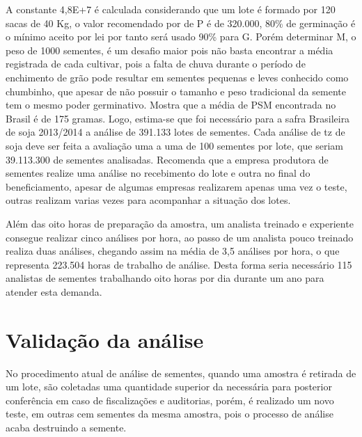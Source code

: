 A constante 4,8E+7 é calculada considerando que um lote é formado por 120 sacas de 40 Kg, o valor recomendado por \cite{abc} de P é de 320.000, 80\% de germinação é o mínimo aceito por lei por tanto será usado 90\% para G. Porém determinar M, o peso de 1000 sementes, é um desafio maior pois não basta encontrar a média registrada de cada cultivar, pois a falta de chuva durante o período de enchimento de grão pode resultar em sementes pequenas e leves \cite{abc} conhecido como chumbinho, que apesar de não possuir o tamanho e peso tradicional da semente tem o mesmo poder germinativo. \cite{abc} Mostra que a média de PSM encontrada no Brasil é de 175 gramas. Logo, estima-se que foi necessário para a safra Brasileira de soja 2013/2014 a análise de 391.133 lotes de sementes. Cada análise de tz de soja deve ser feita a avaliação uma a uma de 100 sementes por lote, que seriam 39.113.300 de sementes analisadas. \cite{abc} Recomenda que a empresa produtora de sementes realize uma análise no recebimento do lote e outra no final do beneficiamento, apesar de algumas empresas realizarem apenas uma vez o teste, outras realizam varias vezes para acompanhar a situação dos lotes. 


Além das oito horas de preparação da amostra, um analista treinado e experiente consegue realizar cinco análises por hora, ao passo de um analista pouco treinado realiza duas análises, chegando assim na média de 3,5 análises por hora, o que representa 223.504 horas de trabalho de análise. Desta forma seria necessário 115 analistas de sementes trabalhando oito horas por dia durante um ano para atender esta demanda. 


\section{Validação da análise}
No procedimento atual de análise de sementes, quando uma amostra é retirada de um lote, são coletadas uma quantidade superior da necessária para posterior conferência em caso de fiscalizações e auditorias, porém, é realizado um novo teste, em outras cem sementes da mesma amostra, pois o processo de análise acaba destruindo a semente.

